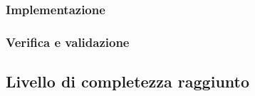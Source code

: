 \subsubsection{Implementazione}
\subsubsection{Verifica e validazione}

\subsection{Livello di completezza raggiunto}